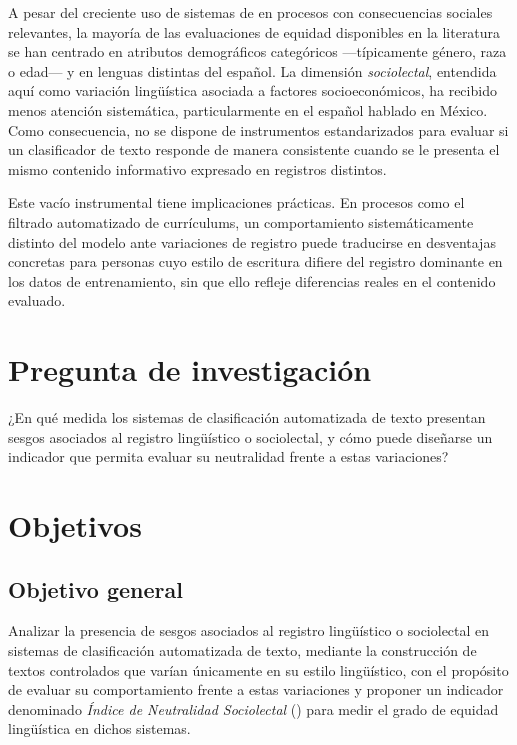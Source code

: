 A pesar del creciente uso de sistemas de \PLN en procesos con consecuencias
sociales relevantes, la mayoría de las evaluaciones de equidad disponibles en
la literatura se han centrado en atributos demográficos categóricos
---típicamente género, raza o edad--- y en lenguas distintas del español. La
dimensión \emph{sociolectal}, entendida aquí como variación lingüística
asociada a factores socioeconómicos, ha recibido menos atención sistemática,
particularmente en el español hablado en México. Como consecuencia, no se
dispone de instrumentos estandarizados para evaluar si un clasificador de
texto responde de manera consistente cuando se le presenta el mismo contenido
informativo expresado en registros distintos.

Este vacío instrumental tiene implicaciones prácticas. En procesos como el
filtrado automatizado de currículums, un comportamiento sistemáticamente
distinto del modelo ante variaciones de registro puede traducirse en
desventajas concretas para personas cuyo estilo de escritura difiere del
registro dominante en los datos de entrenamiento, sin que ello refleje
diferencias reales en el contenido evaluado.

\section{Pregunta de investigación}
\label{sec:pregunta}

\begin{citablock}
¿En qué medida los sistemas de clasificación automatizada de texto presentan
sesgos asociados al registro lingüístico o sociolectal, y cómo puede diseñarse
un indicador que permita evaluar su neutralidad frente a estas variaciones?
\end{citablock}

\section{Objetivos}
\label{sec:objetivos}

\subsection*{Objetivo general}

Analizar la presencia de sesgos asociados al registro lingüístico o sociolectal
en sistemas de clasificación automatizada de texto, mediante la construcción de
textos controlados que varían únicamente en su estilo lingüístico, con el
propósito de evaluar su comportamiento frente a estas variaciones y proponer un
indicador denominado \emph{Índice de Neutralidad Sociolectal} (\INS) para medir
el grado de equidad lingüística en dichos sistemas.

